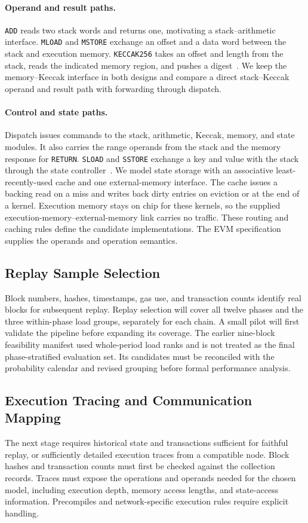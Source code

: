 \documentclass[runningheads]{llncs}
\begin{document}
\paragraph{Operand and result paths.} \texttt{ADD} reads two stack words and returns one, motivating a stack--arithmetic interface. \texttt{MLOAD} and \texttt{MSTORE} exchange an offset and a data word between the stack and execution memory. \texttt{KECCAK256} takes an offset and length from the stack, reads the indicated memory region, and pushes a digest~\cite{evmcancun}. We keep the memory--Keccak interface in both designs and compare a direct stack--Keccak operand and result path with forwarding through dispatch.

\paragraph{Control and state paths.} Dispatch issues commands to the stack, arithmetic, Keccak, memory, and state modules. It also carries the range operands from the stack and the memory response for \texttt{RETURN}. \texttt{SLOAD} and \texttt{SSTORE} exchange a key and value with the stack through the state controller~\cite{evmcancun}. We model state storage with an associative least-recently-used cache and one external-memory interface. The cache issues a backing read on a miss and writes back dirty entries on eviction or at the end of a kernel. Execution memory stays on chip for these kernels, so the supplied execution-memory--external-memory link carries no traffic. These routing and caching rules define the candidate implementations. The EVM specification supplies the operands and operation semantics.

\subsection{Replay Sample Selection}
Block numbers, hashes, timestamps, gas use, and transaction counts identify real blocks for subsequent replay. Replay selection will cover all twelve phases and the three within-phase load groups, separately for each chain. A small pilot will first validate the pipeline before expanding its coverage. The earlier nine-block feasibility manifest used whole-period load ranks and is not treated as the final phase-stratified evaluation set. Its candidates must be reconciled with the probability calendar and revised grouping before formal performance analysis.

\subsection{Execution Tracing and Communication Mapping}
The next stage requires historical state and transactions sufficient for faithful replay, or sufficiently detailed execution traces from a compatible node. Block hashes and transaction counts must first be checked against the collection records. Traces must expose the operations and operands needed for the chosen model, including execution depth, memory access lengths, and state-access information. Precompiles and network-specific execution rules require explicit handling.
\end{document}

